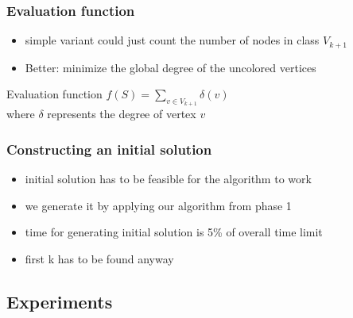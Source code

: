 \documentclass{beamer}
\begin{document}
\begin{frame}
    \frametitle{Evaluation function}

    \begin{itemize}
    \item simple variant could just count the number of nodes in class $V_{k+1}$
    \item Better: minimize the global degree of the uncolored vertices
    \end{itemize}

    \begin{block}{Evaluation function}
      $f(S) = \sum\limits_{v \in V_{k+1}} \delta(v)$\\
      where $\delta$ represents the degree of vertex $v$

      \end{block}

  \end{frame}

\begin{frame}
  \frametitle{Constructing an initial solution}
  \begin{itemize}
  \item initial solution has to be feasible for the algorithm to work
  \item we generate it by applying our algorithm from phase 1
  \item time for generating initial solution is 5\% of overall time limit
  \item first k has to be found anyway
\end{itemize}
  \end{frame}

\subsection{Experiments}
\end{document}
